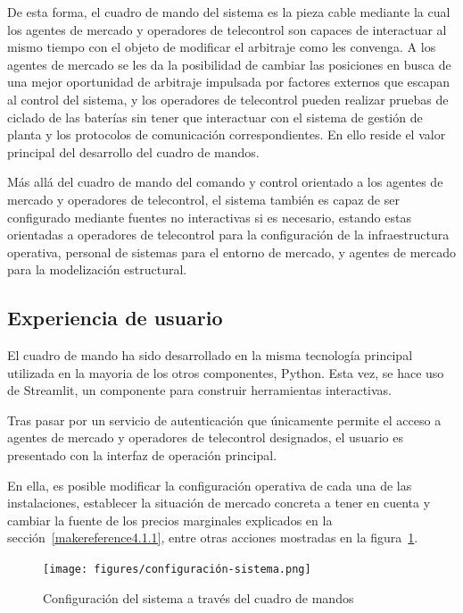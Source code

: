 De esta forma, el cuadro de mando del sistema es la pieza cable mediante la cual los agentes de mercado y operadores de telecontrol son capaces de interactuar al mismo tiempo con el objeto de modificar el arbitraje como les convenga. A los agentes de mercado se les da la posibilidad de cambiar las posiciones en busca de una mejor oportunidad de arbitraje impulsada por factores externos que escapan al control del sistema, y los operadores de telecontrol pueden realizar pruebas de ciclado de las baterías sin tener que interactuar con el sistema de gestión de planta y los protocolos de comunicación correspondientes. En ello reside el valor principal del desarrollo del cuadro de mandos.

Más allá del cuadro de mando del comando y control orientado a los agentes de mercado y operadores de telecontrol, el sistema también es capaz de ser configurado mediante fuentes no interactivas si es necesario, estando estas orientadas a operadores de telecontrol para la configuración de la infraestructura operativa, personal de sistemas para el entorno de mercado, y agentes de mercado para la modelización estructural.

\subsection{Experiencia de usuario}
\label{makereference6.2.1}

El cuadro de mando ha sido desarrollado en la misma tecnología principal utilizada en la mayoria de los otros componentes, Python. Esta vez, se hace uso de Streamlit, un componente para construir herramientas interactivas.

Tras pasar por un servicio de autenticación que únicamente permite el acceso a agentes de mercado y operadores de telecontrol designados, el usuario es presentado con la interfaz de operación principal.

En ella, es posible modificar la configuración operativa de cada una de las instalaciones, establecer la situación de mercado concreta a tener en cuenta y cambiar la fuente de los precios marginales explicados en la sección~\ref{makereference4.1.1}, entre otras acciones mostradas en la figura~\ref{fig:configuración-sistema}.

\begin{figure}
\centering
\texttt{[image: figures/configuración-sistema.png]}
\caption{Configuración del sistema a través del cuadro de mandos}
\label{fig:configuración-sistema}
\end{figure}

